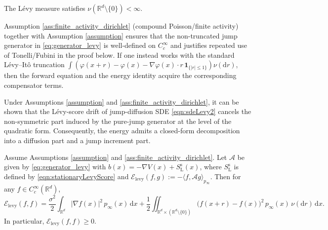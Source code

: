 \begin{assumption}\label{ass:finite_activity_dirichlet}
The L\'evy measure satisfies $\nu(\mathbb{R}^d\setminus\{0\})<\infty$.
\end{assumption}


\begin{remark}\label{rem:truncation_convention}
Assumption \ref{ass:finite_activity_dirichlet} (compound Poisson/finite activity) together with Assumption \ref{assumption}
ensures that the non-truncated jump generator in \eqref{eq:generator_levy} is well-defined on $C_c^\infty$
and justifies repeated use of Tonelli/Fubini in the proof below.
If one instead works with the standard L\'evy--It\^{o} truncation
$\int(\varphi(x+r)-\varphi(x)-\nabla\varphi(x)\cdot r\,\mathbf{1}_{\{|r|\le 1\}})\nu(\mathrm{d}r)$,
then the forward equation and the energy identity acquire the corresponding compensator terms.
\end{remark}

Under Assumptions \ref{assumption} and \ref{ass:finite_activity_dirichlet}, it can be shown that
the L\'evy-score drift of jump-diffusion SDE \eqref{eqn:sdeLevy2} cancels the non-symmetric part induced by the pure-jump generator at the level of the quadratic form.
Consequently, the energy admits a closed-form decomposition into a diffusion part and a jump increment part.

\begin{proposition}\label{thm:closed_form_energy}
Assume Assumptions \ref{assumption} and \ref{ass:finite_activity_dirichlet}. 
Let $\mathcal{A}$ be given by \eqref{eq:generator_levy} with
$b(x)=-\nabla V(x)+S_{\mathrm L}^{\mathrm s}(x)$, where $S_{\mathrm L}^{\mathrm s}$ is defined by \eqref{eqn:stationaryLevyScore} and $\mathcal{E}_{\mathrm{levy}}(f,g):=-\langle f,\mathcal{A}g\rangle_{p_\infty}$.
Then for any $f\in C_c^\infty(\mathbb{R}^d)$,
\begin{equation}\label{eq:closed_form_energy}
\mathcal{E}_{\mathrm{levy}}(f,f)
=
\frac{\sigma^2}{2}\int_{\mathbb{R}^d}|\nabla f(x)|^2\,p_\infty(x)\,\mathrm{d}x
+\frac12\iint_{\mathbb{R}^d\times(\mathbb{R}^d\setminus\{0\})}\big(f(x+r)-f(x)\big)^2\,p_\infty(x)\,\nu(\mathrm{d}r)\,\mathrm{d}x.
\end{equation}
In particular, $\mathcal{E}_{\mathrm{levy}}(f,f)\ge 0$.
\end{proposition}

